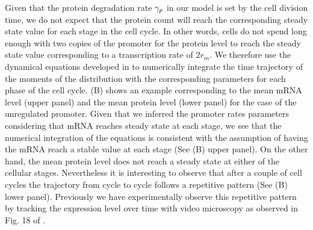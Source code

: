 Given that the protein degradation rate $\gamma _p$ in our model is set by the cell
division time, we do not expect that the protein count will reach the
corresponding steady state value for each stage in the cell cycle. In other
words, cells do not spend long enough with two copies of the promoter for the
protein level to reach the steady state value corresponding to a transcription
rate of $2 r_m$. We therefore use the dynamical equations developed in
 to numerically integrate the time trajectory of the
moments of the distribution with the corresponding parameters for each phase of
the cell cycle. (B) shows an example corresponding to the
mean mRNA level (upper panel) and the mean protein level (lower panel) for the
case of the unregulated promoter. Given that we inferred the promoter rates
parameters considering that mRNA reaches steady state at each stage, we see
that the numerical integration of the equations is consistent with the
assumption of having the mRNA reach a stable value at each stage (See
(B) upper panel). On the other hand, the mean protein
level does not reach a steady state at either of the cellular stages.
Nevertheless it is interesting to observe that after a couple of cell cycles
the trajectory from cycle to cycle follows a repetitive pattern (See
(B) lower panel). Previously we have experimentally
observe this repetitive pattern by tracking the expression level over time with
video microscopy as observed in Fig. 18 of \cite{Phillips2019}.

